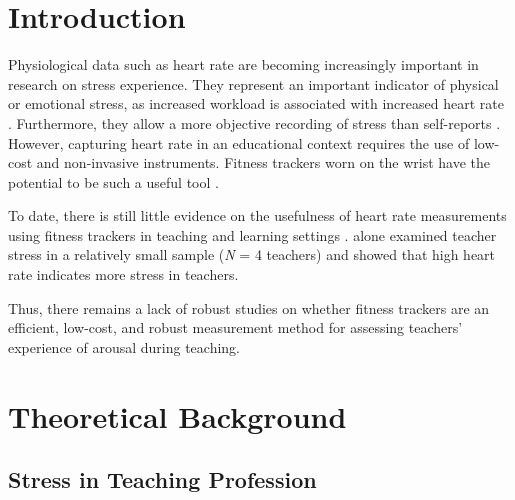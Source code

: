\documentclass[]{elsarticle} %
\newenvironment{Shaded}{\begin{snugshade}}{\end{snugshade}}
\newcommand{\AttributeTok}[1]{\textcolor[rgb]{0.13,0.29,0.53}{#1}}
\newcommand{\CommentTok}[1]{\textcolor[rgb]{0.56,0.35,0.01}{\textit{#1}}}
\newcommand{\DecValTok}[1]{\textcolor[rgb]{0.00,0.00,0.81}{#1}}
\newcommand{\FunctionTok}[1]{\textcolor[rgb]{0.13,0.29,0.53}{\textbf{#1}}}
\newcommand{\NormalTok}[1]{#1}
\newcommand{\SpecialCharTok}[1]{\textcolor[rgb]{0.81,0.36,0.00}{\textbf{#1}}}
\begin{document}
\begin{Shaded}
\end{Shaded}

\hypertarget{introduction}{%
\section{Introduction}\label{introduction}}

Physiological data such as heart rate are becoming increasingly
important in research on stress experience. They represent an important
indicator of physical or emotional stress, as increased workload is
associated with increased heart rate \citep{sachs2014physiologische}.
Furthermore, they allow a more objective recording of stress than
self-reports \citep{rungeusing}. However, capturing heart rate in an
educational context requires the use of low-cost and non-invasive
instruments. Fitness trackers worn on the wrist have the potential to be
such a useful tool \citep{ferguson2015validity}.

To date, there is still little evidence on the usefulness of heart rate
measurements using fitness trackers in teaching and learning settings
\citep{ertzberger2016use, lowe2016educational}. \citet{rungeusing} alone
examined teacher stress in a relatively small sample (\emph{N} = 4
teachers) and showed that high heart rate indicates more stress in
teachers.

Thus, there remains a lack of robust studies on whether fitness trackers
are an efficient, low-cost, and robust measurement method for assessing
teachers' experience of arousal during teaching.

\hypertarget{theoretical-background}{%
\section{Theoretical Background}\label{theoretical-background}}

\hypertarget{stress-in-teaching-profession}{%
\subsection{Stress in Teaching
Profession}\label{stress-in-teaching-profession}}
\end{document}
